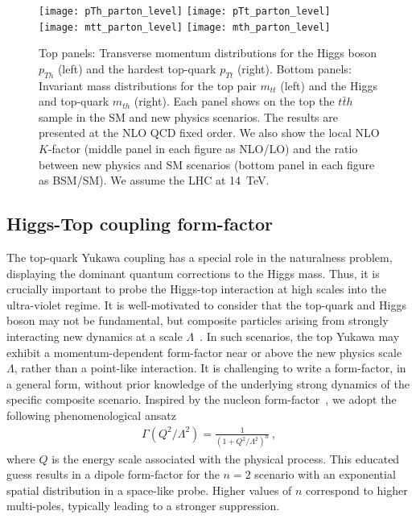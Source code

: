 \documentclass[reprint, aps,prd, preprintnumbers,groupedaddress,nofootinbib]{revtex4-1}
\begin{document}
\begin{figure*}[th!]
    \centering
    \texttt{[image: pTh\_parton\_level]} \hspace{0.5cm}
    \texttt{[image: pTt\_parton\_level]}\\
    \texttt{[image: mtt\_parton\_level]}\hspace{0.5cm}
    \texttt{[image: mth\_parton\_level]}
    \caption{Top panels: Transverse momentum distributions for the Higgs boson $p_{Th}$ (left) and the hardest top-quark $p_{Tt}$ (right). Bottom panels: Invariant mass distributions for the top pair $m_{tt}$ (left) and the Higgs and  top-quark $m_{th}$ (right). Each panel shows on the top the $t\bar{t}h$ sample in the SM and  new physics scenarios.  The results are presented at the NLO QCD fixed order.  We also show the local NLO $K$-factor (middle panel in each figure as NLO/LO) and the ratio between new physics and SM scenarios (bottom panel in each figure as BSM/SM). We assume the LHC at 14~TeV.} 
    \label{fig:pth_parton_level}
\end{figure*}

\subsection{Higgs-Top coupling form-factor}
\label{sec:FF}

The top-quark Yukawa coupling has a special role in the naturalness problem, displaying the  dominant quantum corrections to the Higgs mass. Thus, it is crucially important to probe the Higgs-top interaction at high scales into the ultra-violet regime.
It is well-motivated to consider that the top-quark and Higgs boson may not be fundamental, but composite particles arising from strongly interacting new dynamics at a scale $\Lambda$~\cite{Pomarol:2012qf,Panico:2015jxa,Liu:2017dsz,Banerjee:2021qhr}.  In such scenarios, 
the top Yukawa may exhibit a momentum-dependent form-factor near or above the new physics scale $\Lambda$, rather than a point-like interaction. It is challenging to write a form-factor, in a general form, without prior knowledge of the underlying strong dynamics of the specific composite scenario. Inspired by the nucleon form-factor~\cite{Punjabi:2015bba}, we adopt the following phenomenological ansatz
\begin{align}
    \Gamma(Q^2/\Lambda^2)=\frac{1}{\left(1+Q^2/\Lambda^2\right)^n}\,,
\end{align}
where $Q$ is the energy scale associated with the physical process. This educated guess results in a dipole form-factor for the $n=2$ scenario with an exponential spatial distribution in a space-like probe. Higher values of $n$ correspond to higher multi-poles, typically leading to a stronger suppression.
\end{document}
